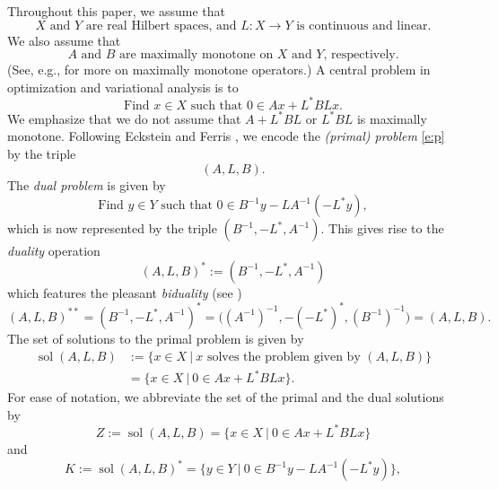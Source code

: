 \documentclass{article}
\newcommand{\menge}[2]{\big\{{#1}~\big |~{#2}\big\}}
\newcommand{\sol}{\ensuremath{\operatorname{sol}}}
\begin{document}
Throughout this paper, we assume that 
\begin{equation}
\text{$X$ and $Y$ are real Hilbert spaces, and $L\colon X\to Y$ is continuous and linear.}
\end{equation}
We also assume that 
\begin{equation}
\text{$A$ and $B$ are maximally monotone on $X$ and $Y$, respectively.}
\end{equation}
(See, e.g., \cite{BC2017} for more on maximally monotone operators.)
A central problem in optimization and variational analysis is to 
\begin{equation}\label{e:p}
\text{Find }x\in X\text{ such that }0\in Ax+L^*BLx.
\end{equation}
We emphasize that we do not assume that $A+L^*BL$ or $L^*BL$ is maximally monotone. 
Following Eckstein and Ferris \cite{EF}, 
we encode the \emph{(primal) problem} \cref{e:p} by the triple 
\begin{equation}
(A,L,B). 
\end{equation}
The \emph{dual problem} is given by 
\begin{equation}
\label{e:d} 
\text{Find $y\in Y$ such that }
0\in B^{-1}y -LA^{-1}(-L^*y),
\end{equation}
which is now represented by the triple 
$(B^{-1},-L^*,A^{-1})$. 
This gives rise to the \emph{duality} operation
\begin{equation}
(A,L,B)^* := (B^{-1},-L^*,A^{-1})
\end{equation}
which features the pleasant \emph{biduality} (see \cite[Section~2.1]{EF})
\begin{equation}
(A,L,B)^{**} = (B^{-1},-L^*,A^{-1})^* = 
\big((A^{-1})^{-1},-(-L^*)^*,(B^{-1})^{-1}  \big)
=(A,L,B). 
\end{equation}
The set of solutions to the primal problem is given by 
\begin{subequations}
\begin{align}
\sol(A,L,B) &:= \menge{x\in X}{\text{$x$ solves the problem 
given by $(A,L,B)$}}\\
&= 
\menge{x\in X}{0\in Ax+L^*BLx}. 
\end{align}
\end{subequations}
For ease of notation, 
we abbreviate the set of the primal and the dual solutions by 
\begin{equation}
\label{e:Z}
Z := \sol(A,L,B) = \menge{x\in X}{0\in Ax+L^*BLx}
\end{equation}
and 
\begin{equation}
\label{e:K}
K := \sol(A,L,B)^* = \menge{y\in Y}{0\in B^{-1}y-LA^{-1}(-L^*y)}, 
\end{equation}
\end{document}
